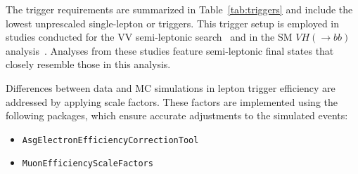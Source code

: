 \label{subsec:trigger_requirements}

The trigger requirements are summarized in Table~\ref{tab:triggers} and include the lowest unprescaled single-lepton or \met triggers. 
This trigger setup is employed in studies conducted for the VV semi-leptonic search~\cite{Bachas:2646593} and in the SM $VH\left(\to bb\right)$ analysis~\cite{HIGG-2018-04}. Analyses from these studies feature semi-leptonic final states that closely resemble those in this analysis.

Differences between data and MC simulations in lepton trigger efficiency are addressed by applying scale factors. These factors are implemented using the following packages, which ensure accurate adjustments to the simulated events:
\begin{itemize}
    \item \texttt{AsgElectronEfficiencyCorrectionTool}
    \item \texttt{MuonEfficiencyScaleFactors}
\end{itemize}

